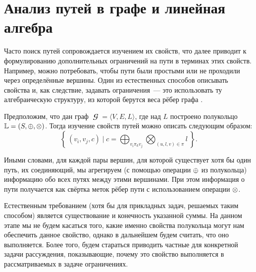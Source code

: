 \section{Анализ путей в графе и линейная алгебра}
\label{sec:PathAlgebra}

Часто поиск путей сопровождается изучением их свойств, что далее приводит к формулированию дополнительных ограничений на пути в терминах этих свойств.
Например, можно потребовать, чтобы пути были простыми или не проходили через определённые вершины.
Один из естественных способов описывать свойства и, как следствие, задавать ограничения~--- это использовать ту алгебраическую структуру, из которой берутся веса рёбер графа%
.

Предположим, что дан граф $\mbfscrG = \langle V, E, L\rangle $, где над $L$ построено полукольцо $\mathbb{L} = (S, \oplus, \otimes)$\label{itm:otimesIntro}.
Тогда изучение свойств путей можно описать следующим образом:
\begin{equation}
    \label{eq:algPathProblem}
    \left\{\ (v_i, v_j, c) \mid c = \bigoplus_{v_i \pi_k v_j} \bigotimes_{(u, l, v) \in \pi } l \ \right\}.
\end{equation}

Иными словами, для каждой пары вершин, для которой существует хотя бы один путь, их соединяющий, мы агрегируем (с помощью операции $\oplus$ из полукольца) информацию обо всех путях между этими вершинами.
При этом информация о пути получается как свёртка меток рёбер пути с использованием операции%
$\otimes$.

Естественным требованием (хотя бы для прикладных задач, решаемых таким способом) является существование и конечность указанной суммы.
На данном этапе мы не будем касаться того, какие именно свойства полукольца могут нам обеспечить данное свойство, однако в дальнейшем будем считать, что оно выполняется.
Более того, будем стараться приводить частные для конкретной задачи рассуждения, показывающие, почему это свойство выполняется в рассматриваемых в задаче ограничениях.

